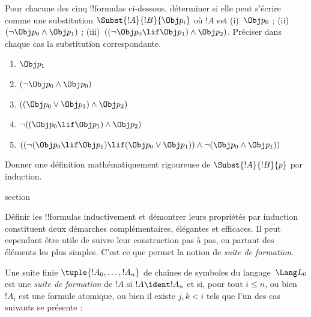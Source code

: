 \documentclass[11pt,a4paper,openany]{memoir}
\begin{document}
\begin{prob}
Pour chacune des cinq !!{formula}s ci-dessous, déterminer si elle
peut s'écrire comme une substitution \(\Subst{!A}{!B}{\Obj p_i}\)
où \(!A\) est (i)~\(\Obj p_0\) ; (ii)~\((\lnot \Obj p_0 \land \Obj
p_1)\) ; (iii)~\(((\lnot \Obj p_0 \lif \Obj p_1) \land \Obj
p_2)\). Préciser dans chaque cas la substitution correspondante.
  \begin{enumerate}
    \item \(\Obj p_1\)
    \item \((\lnot \Obj p_0 \land \Obj p_0)\)
    \item \(((\Obj p_0 \lor \Obj p_1) \land \Obj p_2)\)
    \item \(\lnot ((\Obj p_0 \lif \Obj p_1) \land \Obj p_2)\)
    \item \(((\lnot (\Obj p_0 \lif \Obj p_1) \lif (\Obj p_0 \lor \Obj p_1)) \land \lnot (\Obj p_0 \land \Obj p_1))\)
  \end{enumerate}
\end{prob}

\begin{prob}
Donner une définition mathématiquement rigoureuse de $\Subst{!A}{!B}{p}$
par induction.
\end{prob}


\endgroup



\begingroup
\expandafter\def\csname ol@sectioncs\endcsname{section}
\def\olfilename{formation-sequences}




Définir les !!{formula}s inductivement et démontrer leurs propriétés
par induction constituent deux démarches complémentaires, élégantes
et efficaces. Il peut cependant être utile de suivre leur construction
pas à pas, en partant des éléments les plus simples. C'est ce que
permet la notion de \emph{suite de formation}.

\begin{defn}
Une suite finie $\tuple{!A_0,\dotsc,!A_n}$ de chaînes de symboles
du langage~$\Lang L_0$ est une \emph{suite de formation} de $!A$ si
$!A \ident !A_n$ et si, pour tout $i \leq n$, ou bien $!A_i$ est
une formule atomique, ou bien il existe $j,k < i$ tels que l'un
des cas suivants se présente :
\begin{enumerate}
\end{enumerate}
\end{defn}
\end{document}
